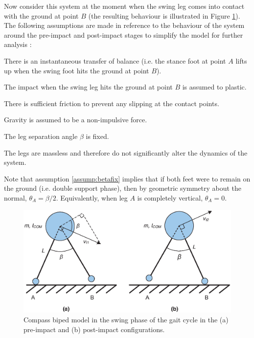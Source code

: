Now consider this system at the moment when the swing leg comes into contact with the ground at point $B$ (the resulting behaviour is illustrated in Figure \ref{fig:prepost}). The following assumptions are made in reference to the behaviour of the system around the pre-impact and post-impact stages to simplify the model for further analysis \cite{Wight:2008vt}: 

\hrulefill

\begin{assumption}
	There is an instantaneous transfer of balance (i.e. the stance foot at point $A$ lifts up when the swing foot hits the ground at point $B$).  
\end{assumption}

\begin{assumption}
	The impact when the swing leg hits the ground at point $B$ is assumed to plastic. 
\end{assumption}

\begin{assumption}
	There is sufficient friction to prevent any slipping at the contact points. 
\end{assumption}

\begin{assumption}
	Gravity is assumed to be a non-impulsive force. 
\end{assumption}

\begin{assumption} \label{assump:betafix}
	The leg separation angle $\beta$ is fixed.
\end{assumption}

\begin{assumption} \label{assump:massless}
	The legs are massless and therefore do not significantly alter the dynamics of the system. 
\end{assumption}

\hrulefill

Note that assumption \ref{assump:betafix} implies that if both feet were to remain on the ground (i.e. double support phase), then by geometric symmetry about the normal, $\theta _A = \beta/2$. Equivalently, when leg $A$ is completely vertical, $\theta _A = 0$.

\begin{figure}[!h]
	\centering
    \includegraphics[scale=0.6]{fig/fpe/fig2.eps}
  	\caption{Compass biped model in the swing phase of the gait cycle in the (a) pre-impact and (b) post-impact configurations.}
	\label{fig:prepost}
\end{figure}

